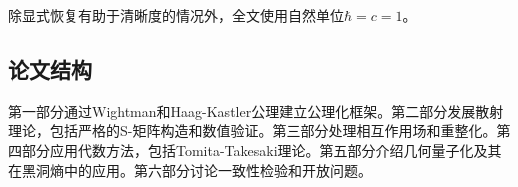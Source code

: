 除显式恢复有助于清晰度的情况外，全文使用自然单位$\hbar = c = 1$。

\subsection{论文结构}

第一部分通过Wightman和Haag-Kastler公理建立公理化框架。第二部分发展散射理论，包括严格的S-矩阵构造和数值验证。第三部分处理相互作用场和重整化。第四部分应用代数方法，包括Tomita-Takesaki理论。第五部分介绍几何量子化及其在黑洞熵中的应用。第六部分讨论一致性检验和开放问题。

